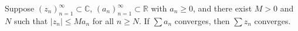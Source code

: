 Suppose $(z_n)_{n=1}^{\infty} \subset \mathbb{C}$, $(a_n)_{n=1}^{\infty} \subset \mathbb{R}$ with $a_n \geq 0$, and there exist $M > 0$ and $N$ such that $|z_n| \leq M a_n$ for all $n \geq N$. If $\sum a_n$ converges, then $\sum z_n$ converges.
